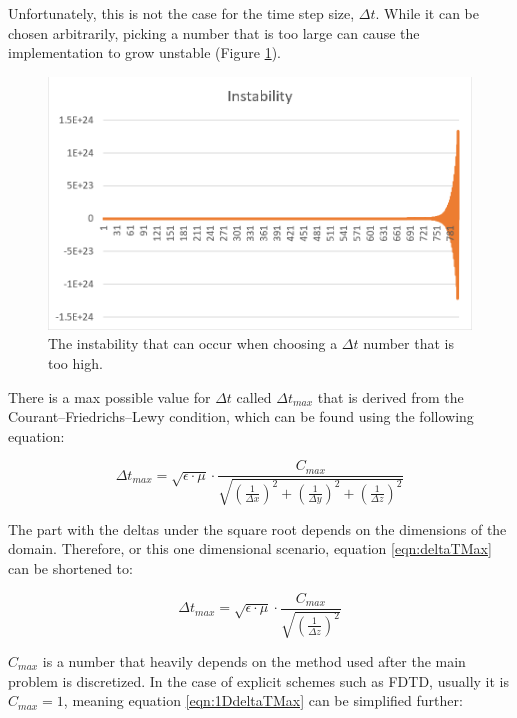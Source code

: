Unfortunately, this is not the case for the time step size, $\Delta t$. While it can be chosen arbitrarily, picking a number that is too large can cause the implementation to grow unstable (Figure \ref{fig:fdtd1dinstability}).

\begin{figure}[!h]
	\centering
	\includegraphics[scale=0.5]{Figures/fdtd1dinstability}
	\decoRule
	\caption[Instability]{The instability that can occur when choosing a $\Delta t$ number that is too high.}
	\label{fig:fdtd1dinstability}
\end{figure}

There is a max possible value for $\Delta t$ called $\Delta t_{max}$ that is derived from the Courant–Friedrichs–Lewy condition, which can be found using the following equation:

\begin{equation}
	\label{eqn:deltaTMax}
	\Delta t_{max} = \sqrt{\epsilon \cdot \mu} \cdot \frac{C_{max}}{\sqrt{(\frac{1}{\Delta x})^2 + (\frac{1}{\Delta y})^2 + (\frac{1}{\Delta z})^2}}
\end{equation}

The part with the deltas under the square root depends on the dimensions of the domain. Therefore, or this one dimensional scenario, equation \ref{eqn:deltaTMax} can be shortened to:

\begin{equation}
	\label{eqn:1DdeltaTMax}
	\Delta t_{max} = \sqrt{\epsilon \cdot \mu} \cdot \frac{C_{max}}{\sqrt{(\frac{1}{\Delta z})^2}}
\end{equation}

$C_{max}$ is a number that heavily depends on the method used after the main problem is discretized. In the case of explicit schemes such as FDTD, usually it is $C_{max} = 1$, meaning equation \ref{eqn:1DdeltaTMax} can be simplified further:

